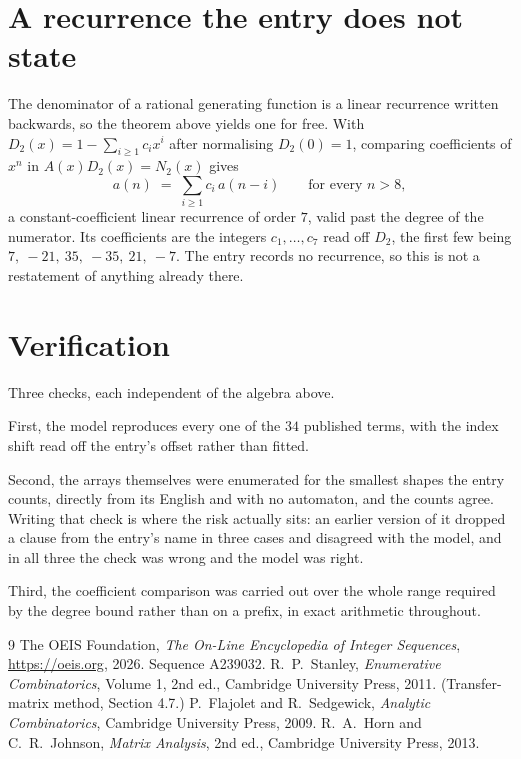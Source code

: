 \documentclass[11pt,a4paper]{article}
\theoremstyle{plain}
\theoremstyle{definition}
\begin{document}
\section{A recurrence the entry does not state}

The denominator of a rational generating function is a linear recurrence written backwards, so
the theorem above yields one for free. With $D_2(x)=1-\sum_{i\ge1}c_ix^i$ after normalising
$D_2(0)=1$, comparing coefficients of $x^n$ in $A(x)D_2(x)=N_2(x)$ gives
\[
a(n)\;=\;\sum_{i\ge1}c_i\,a(n-i)\qquad\text{for every }n>8,
\]
a constant-coefficient linear recurrence of order $7$, valid past the degree of the
numerator. Its coefficients are the integers $c_1,\dots,c_{7}$ read off $D_2$, the first few being $7,\ -21,\ 35,\ -35,\ 21,\ -7$. The entry records no recurrence, so this is not a restatement of anything
already there.

\section{Verification}

Three checks, each independent of the algebra above.

First, the model reproduces every one of the $34$ published terms, with the index shift
read off the entry's offset rather than fitted.

Second, the arrays themselves were enumerated for the smallest shapes the entry counts,
directly from its English and with no automaton, and the counts agree. Writing that check is
where the risk actually sits: an earlier version of it dropped a clause from the entry's name
in three cases and disagreed with the model, and in all three the check was wrong and the model
was right.

Third, the coefficient comparison was carried out over the whole range required by the degree
bound rather than on a prefix, in exact arithmetic throughout.

\begin{thebibliography}{9}
 The OEIS Foundation, \emph{The On-Line Encyclopedia of Integer
Sequences}, \url{https://oeis.org}, 2026. Sequence A239032.
 R.~P.~Stanley, \emph{Enumerative Combinatorics}, Volume 1, 2nd ed.,
Cambridge University Press, 2011. (Transfer-matrix method, Section 4.7.)
 P.~Flajolet and R.~Sedgewick, \emph{Analytic Combinatorics}, Cambridge
University Press, 2009.
 R.~A.~Horn and C.~R.~Johnson, \emph{Matrix Analysis}, 2nd ed., Cambridge
University Press, 2013.
\end{thebibliography}
\end{document}
